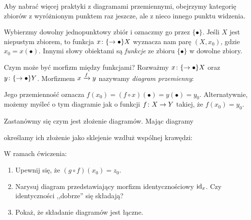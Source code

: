 \begin{exc}
  \label{exc:setstardlabystrzakow}
  {
  \newcommand{\bulletset}{\{\bullet\}}
  Aby nabrać więcej praktyki z diagramami przemiennymi, obejrzymy kategorię zbiorów z wyróżnionym punktem raz jeszcze, ale z nieco innego punktu widzenia.

  Wybierzmy dowolny jednopunktowy zbiór i oznaczmy go przez $\bulletset$. Jeśli $X$ jest niepustym zbiorem, to funkcja
  $\morph x\bulletset X$ wyznacza nam parę $(X, x_0)$, gdzie $x_0=x(\bullet)$. Innymi słowy obiektami są \emph{funkcje} ze zbioru $\bulletset$ w dowolne zbiory.

  Czym może być morfizm między funkcjami? Rozważmy $\morph x\bulletset X$ oraz $\morph y\bulletset Y$. Morfizmem $\morpharr fxy$ nazywamy \emph{diagram przemienny}:
  \begin{center}
  \end{center}
  Jego przemienność oznacza $f(x_0) = (f\circ x)(\bullet) = y(\bullet) = y_0$. Alternatywnie, możemy myśleć o tym diagramie jak o funkcji $\morph fXY$ takiej, że $f(x_0)=y_0$.

  Zastanówmy się czym jest złożenie diagramów. Mając diagramy
  \begin{center}
  \end{center}
  określamy ich złożenie jako sklejenie wzdłuż wspólnej krawędzi:
  \begin{center}
  \end{center}
  W ramach ćwiczenia:
  \begin{enumerate}
    \item Upewnij się, że $(g\circ f)(x_0) = z_0$.
    \item Narysuj diagram przedstawiający morfizm identycznościowy $\id x$. Czy identyczności ,,dobrze'' się składają?
    \item Pokaż, że składanie diagramów jest łączne.
  \end{enumerate}
  }
\end{exc}

